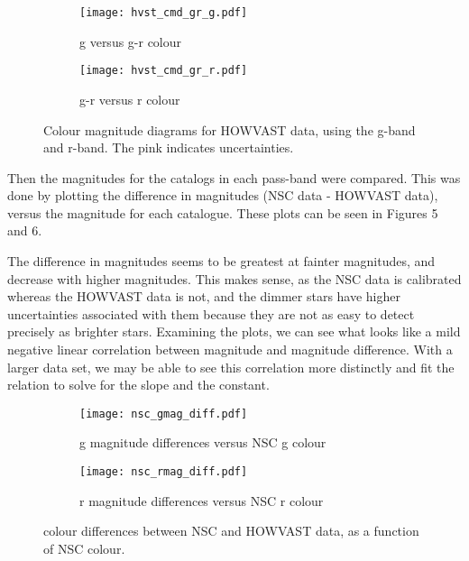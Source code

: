 \documentclass{article}
\begin{document}
\begin{figure}[ht!]
\begin{subfigure}{.5\textwidth}
  \centering
  \texttt{[image: hvst\_cmd\_gr\_g.pdf]}
  \caption{g versus g-r colour}
  \label{fig:hvst1}
\end{subfigure}%
\begin{subfigure}{.5\textwidth}
  \centering
  \texttt{[image: hvst\_cmd\_gr\_r.pdf]}
  \caption{g-r versus r colour}
  \label{fig:hvst2}
\end{subfigure}
\caption{Colour magnitude diagrams for HOWVAST data, using the g-band and r-band. The pink indicates uncertainties.}
\label{fig:hvst}
\end{figure}




Then the magnitudes for the catalogs in each pass-band were compared. This was done by plotting the difference in magnitudes (NSC data - HOWVAST data), versus the magnitude for each catalogue. These plots can be seen in Figures 5 and 6. 

The difference in magnitudes seems to be greatest at fainter magnitudes, and decrease with higher magnitudes. This makes sense, as the NSC data is calibrated whereas the HOWVAST data is not, and the dimmer stars have higher uncertainties associated with them because they are not as easy to detect precisely as brighter stars. Examining the plots, we can see what looks like a mild negative linear correlation between magnitude and magnitude difference. With a larger data set, we may be able to see this correlation more distinctly and fit the relation to solve for the slope and the constant.

\clearpage

\begin{figure}[ht!]
\begin{subfigure}{.5\textwidth}
  \centering
  \texttt{[image: nsc\_gmag\_diff.pdf]}
  \caption{g magnitude differences versus NSC g colour}
  \label{fig:nscdiff1}
\end{subfigure}%
\begin{subfigure}{.5\textwidth}
  \centering
  \texttt{[image: nsc\_rmag\_diff.pdf]}
  \caption{r magnitude differences versus NSC r colour}
  \label{fig:nscdiff2}
\end{subfigure}
\caption{colour differences between NSC and HOWVAST data, as a function of NSC colour.}
\label{fig:nscdiff}
\end{figure}
\end{document}
